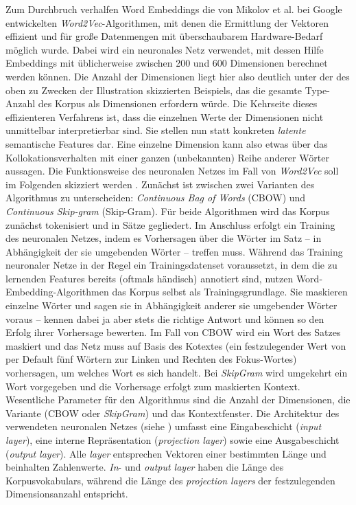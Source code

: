 Zum Durchbruch verhalfen Word Embeddings die von Mikolov et al. \autocite*{mikolovEfficientEstimationWord2013} bei Google entwickelten \emph{Word2Vec}-Algorithmen, mit denen die Ermittlung der Vektoren effizient und für große Datenmengen mit überschaubarem Hardware-Bedarf möglich wurde. Dabei wird ein neuronales Netz verwendet, mit dessen Hilfe Embeddings mit üblicherweise zwischen 200 und 600 Dimensionen berechnet werden können. Die Anzahl der Dimensionen liegt hier also deutlich unter der des oben zu Zwecken der Illustration skizzierten Beispiels, das die gesamte Type-Anzahl des Korpus als Dimensionen erfordern würde. Die Kehrseite dieses effizienteren Verfahrens ist, dass die einzelnen Werte der Dimensionen nicht unmittelbar interpretierbar sind. Sie stellen nun statt konkreten \emph{latente} semantische Features dar. Eine einzelne Dimension kann also etwas über das Kollokationsverhalten mit einer ganzen (unbekannten) Reihe anderer Wörter aussagen. Die Funktionsweise des neuronalen Netzes im Fall von \emph{Word2Vec} \autocite{mikolovEfficientEstimationWord2013} soll im Folgenden skizziert werden \autocite[siehe ausführlich][]{rongWord2vecParameterLearning2016}. Zunächst ist zwischen zwei Varianten des Algorithmus zu unterscheiden: \emph{Continuous Bag of Words} (CBOW) und \emph{Continuous Skip-gram} (Skip-Gram). Für beide Algorithmen wird das Korpus zunächst tokenisiert und in Sätze gegliedert. Im Anschluss erfolgt ein Training des neuronalen Netzes, indem es Vorhersagen über die Wörter im Satz -- in Abhängigkeit der sie umgebenden Wörter -- treffen muss. Während das Training neuronaler Netze in der Regel ein Trainingsdatenset voraussetzt, in dem die zu lernenden Features bereits (oftmals händisch) annotiert sind, nutzen Word-Embedding-Algorithmen das Korpus selbst als Trainingsgrundlage. Sie maskieren einzelne Wörter und sagen sie in Abhängigkeit anderer sie umgebender Wörter voraus -- kennen dabei ja aber stets die richtige Antwort und können so den Erfolg ihrer Vorhersage bewerten. Im Fall von CBOW wird ein Wort des Satzes maskiert und das Netz muss auf Basis des Kotextes (ein festzulegender Wert von per Default fünf Wörtern zur Linken und Rechten des Fokus-Wortes) vorhersagen, um welches Wort es sich handelt. Bei \emph{SkipGram} wird umgekehrt ein Wort vorgegeben und die Vorhersage erfolgt zum maskierten Kontext. Wesentliche Parameter für den Algorithmus sind die Anzahl der Dimensionen, die Variante (CBOW oder \emph{SkipGram}) und das Kontextfenster. Die Architektur des verwendeten neuronalen Netzes (siehe ) umfasst eine Eingabeschicht (\emph{input layer}), eine interne Repräsentation (\emph{projection layer}) sowie eine Ausgabeschicht (\emph{output layer}). Alle \emph{layer} entsprechen Vektoren einer bestimmten Länge und beinhalten Zahlenwerte. \emph{In}- und \emph{output layer} haben die Länge des Korpusvokabulars, während die Länge des \emph{projection layers} der festzulegenden Dimensionsanzahl entspricht.

